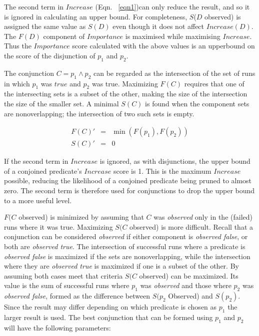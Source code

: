 The second term in $Increase$ (Eqn. ~\ref{eqn1})can only reduce the result, and so it is ignored in calculating an upper bound.  For completeness, $S$($D$ observed) is assigned the same value as $S(D)$ even though it does not affect $Increase(D)$.  The $F(D)$ component of $Importance$ is maximised while maximising $Increase$.  Thus the $Importance$ score calculated with the above values is an upperbound on the score of the disjunction of $p_1$ and $p_2$.

The conjunction $C = p_1 \wedge p_2$ can be regarded as the intersection of the set of runs in which $p_1$ was $true$ and $p_2$ was true.  Maximizing $F(C)$ requires that one of the intersecting sets is a subset of the other, making the size of the intersection the size of the smaller set.  A minimal $S(C)$ is found when the component sets are nonoverlapping; the intersection of two such sets is empty.

\begin{eqnarray}
 \nonumber %
  F(C)' &=&  \min(F(p_1),F(p_2)) \\
 \nonumber
  S(C)' &=& 0
\end{eqnarray}

If the second term in $Increase$ is ignored, as with disjunctions, the upper bound of a conjoined predicate's $Increase$ score is 1.  This is the maximum $Increase$ possible, reducing the likelihood of a conjoined predicate being pruned to almost zero.  The second term is therefore used for conjunctions to drop the upper bound to a more useful level.

$F(C$ observed) is minimized by assuming that $C$ was \textit{observed} only in the (failed) runs where it was true.  Maximizing $S(C$ observed) is more difficult.  Recall that a conjunction can be considered \textit{observed} if either component is \textit{observed false}, or both are \textit{observed true}.  The intersection of successful runs where a predicate is \textit{observed false} is maximized if the sets are nonoverlapping, while the intersection where they are \textit{observed true} is maximized if one is a subset of the other.  By assuming both cases meet that criteria $S(C$ observed) can be maximized.  Its value is the sum of successful runs where $p_1$ was \textit{observed} and those where $p_2$ was \textit{observed false}, formed as the difference between $S(p_2$  Observed) and $S(p_2)$.  Since the result may differ depending on which predicate is chosen as $p_1$ the larger result is used.  The best conjunction that can be formed using $p_1$ and $p_2$ will have the following parameters:

